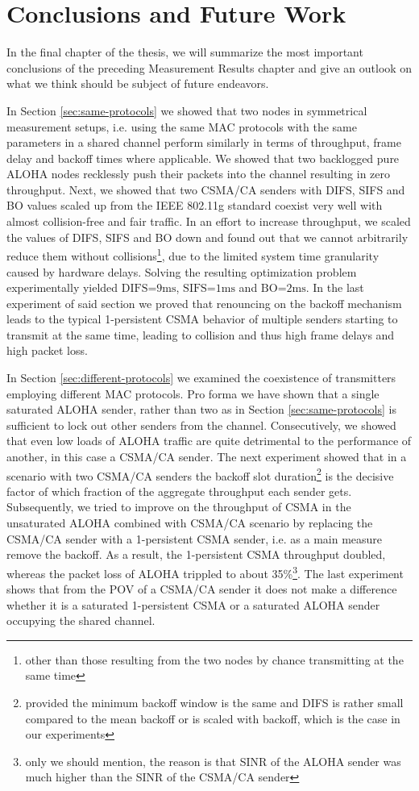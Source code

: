 \chapter{Conclusions and Future Work}

In the final chapter of the thesis, we will summarize the most important conclusions of the preceding Measurement Results chapter and give an outlook on what we think should be subject of future endeavors.

In Section \ref{sec:same-protocols} we showed that two nodes in symmetrical measurement setups, i.e. using the same MAC protocols with the same parameters in a shared channel perform similarly in terms of throughput, frame delay and backoff times where applicable. We showed that two backlogged pure ALOHA nodes recklessly push their packets into the channel resulting in zero throughput. Next, we showed that two CSMA/CA senders with DIFS, SIFS and BO values scaled up from the IEEE 802.11g standard coexist very well with almost collision-free and fair traffic. In an effort to increase throughput, we scaled the values of DIFS, SIFS and BO down and found out that we cannot arbitrarily reduce them without collisions\footnote{other than those resulting from the two nodes by chance transmitting at the same time}, due to the limited system time granularity caused by hardware delays. Solving the resulting optimization problem experimentally yielded $\text{DIFS=9ms}$, $\text{SIFS=1ms}$ and $\text{BO=2ms}$. In the last experiment of said section we proved that renouncing on the backoff mechanism leads to the typical 1-persistent CSMA behavior of multiple senders starting to transmit at the same time, leading to collision and thus high frame delays and high packet loss.

In Section \ref{sec:different-protocols} we examined the coexistence of transmitters employing different MAC protocols. Pro forma we have shown that a single saturated ALOHA sender, rather than two as in Section \ref{sec:same-protocols} is sufficient to lock out other senders from the channel. Consecutively, we showed that even low loads of ALOHA traffic are quite detrimental to the performance of another, in this case a CSMA/CA sender. The next experiment showed that in a scenario with two CSMA/CA senders the backoff slot duration\footnote{provided the minimum backoff window is the same and DIFS is rather small compared to the mean backoff or is scaled with backoff, which is the case in our experiments} is the decisive factor of which fraction of the aggregate throughput each sender gets. Subsequently, we tried to improve on the throughput of CSMA in the unsaturated ALOHA combined with CSMA/CA scenario by replacing the CSMA/CA sender with a 1-persistent CSMA sender, i.e. as a main measure remove the backoff. As a result, the 1-persistent CSMA throughput doubled, whereas the packet loss of ALOHA trippled to about 35\%\footnote{only we should mention, the reason is that SINR of the ALOHA sender was much higher than the SINR of the CSMA/CA sender}. The last experiment shows that from the POV of a CSMA/CA sender it does not make a difference whether it is a saturated 1-persistent CSMA or a saturated ALOHA sender occupying the shared channel.    

